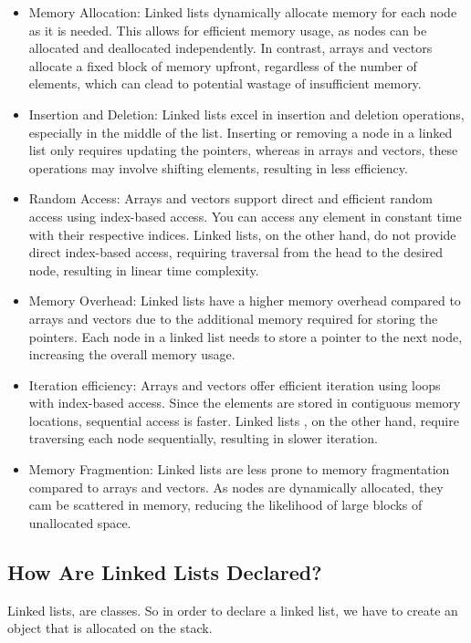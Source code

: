 \documentclass[a4paper,9pt]{article}
\begin{document}
\begin{itemize}
    \item Memory Allocation: Linked lists dynamically allocate memory for each node as it is needed. This allows for efficient memory
    usage, as nodes can be allocated and deallocated independently. In contrast, arrays and vectors allocate a fixed block of memory
    upfront, regardless of the number of elements, which can clead to potential wastage of insufficient memory.
    \item Insertion and Deletion: Linked lists excel in insertion and deletion operations, especially in the middle of the list. Inserting
    or removing a node in a linked list only requires updating the pointers, whereas in arrays and vectors, these operations may involve
    shifting elements, resulting in less efficiency.
    \item Random Access: Arrays and vectors support direct and efficient random access using index-based access. You can access any element
    in constant time with their respective indices. Linked lists, on the other hand, do not provide direct index-based access, requiring traversal
    from the head to the desired node, resulting in linear time complexity.
    \item Memory Overhead: Linked lists have a higher memory overhead compared to arrays and vectors due to the additional memory required for storing
    the pointers. Each node in a linked list needs to store a pointer to the next node, increasing the overall memory usage.
    \item Iteration efficiency: Arrays and vectors offer efficient iteration using loops with index-based access. Since the elements are stored in
    contiguous memory locations, sequential access is faster. Linked lists , on the other hand, require traversing each node sequentially, resulting in
    slower iteration.
    \item Memory Fragmention: Linked lists are less prone to memory fragmentation compared to arrays and vectors. As nodes are dynamically allocated, they
    cam be scattered in memory, reducing the likelihood of large blocks of unallocated space.
\end{itemize}

\subsection*{How Are Linked Lists Declared?}

Linked lists, are classes. So in order to declare a linked list, we have to create an object that is allocated on the stack.
\end{document}
